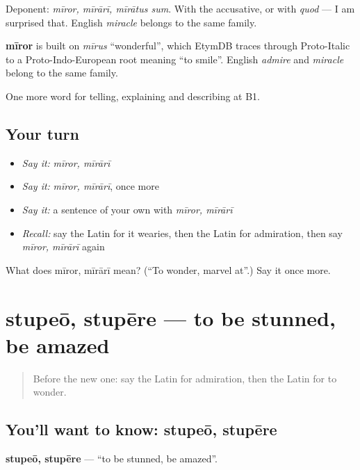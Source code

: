Deponent: \emph{mīror, mīrārī, mīrātus sum}. With the accusative, or with \emph{quod} — I am surprised that. English \emph{miracle} belongs to the same family.

\begin{cousinweb}
\textbf{mīror} is built on \emph{mīrus} \textquotedblleft{}wonderful\textquotedblright{}, which EtymDB traces through Proto-Italic to a Proto-Indo-European root meaning \textquotedblleft{}to smile\textquotedblright{}. English \emph{admire} and \emph{miracle} belong to the same family.
\end{cousinweb}

\begin{grammarlens}[title={What you've built}]
One more word for telling, explaining and describing at B1.
\end{grammarlens}

\subsection*{Your turn}
\begin{itemize}
\raggedright
  \item \emph{Say it:} \emph{mīror, mīrārī}
  \item \emph{Say it:} \emph{mīror, mīrārī}, once more
  \item \emph{Say it:} a sentence of your own with \emph{mīror, mīrārī}
  \item \emph{Recall:} say the Latin for it wearies, then the Latin for admiration, then say \emph{mīror, mīrārī} again
\end{itemize}

\begin{tcolorbox}[breakable,colback=teal!4,colframe=teal!35!black,title={Before you move on}]
What does mīror, mīrārī mean? (\textquotedblleft{}To wonder, marvel at\textquotedblright{}.) Say it once more.
\end{tcolorbox}
\section[stupeō, stupēre]{stupeō, stupēre — to be stunned, be amazed}

\label{lesson:LA-C495-stupeo}



\begin{quote}
Before the new one: say the Latin for admiration, then the Latin for to wonder.
\end{quote}

\subsection*{You'll want to know: stupeō, stupēre}
\textbf{stupeō, stupēre} — \textquotedblleft{}to be stunned, be amazed\textquotedblright{}.

